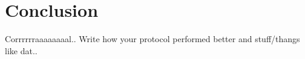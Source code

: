 
\chapter{Conclusion} %

\label{conc} %



Corrrrrraaaaaaaal.. Write how your protocol performed better and stuff/thangs like dat..
